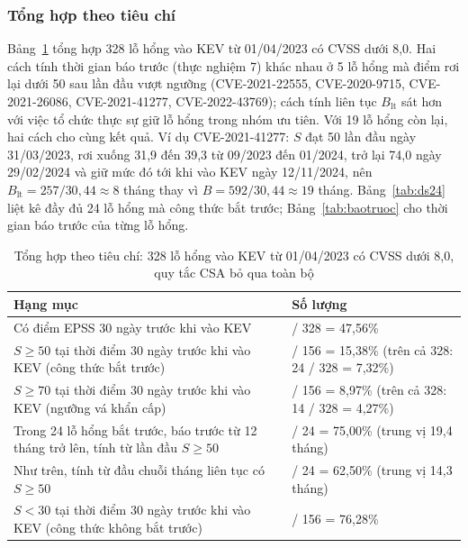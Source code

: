 \documentclass[conference]{IEEEtran}
\begin{document}
\subsubsection{Tổng hợp theo tiêu chí}
Bảng~\ref{tab:tonghopth} tổng hợp 328 lỗ hổng vào KEV từ 01/04/2023 có CVSS dưới 8,0. Hai cách tính thời gian báo trước (thực
nghiệm 7) khác nhau ở 5 lỗ hổng mà điểm rơi lại dưới 50 sau lần đầu vượt ngưỡng (CVE-2021-22555, CVE-2020-9715,
CVE-2021-26086, CVE-2021-41277, CVE-2022-43769); cách tính liên tục $B_{\text{lt}}$ sát hơn với việc tổ chức thực
sự giữ lỗ hổng trong nhóm ưu tiên. Với 19 lỗ hổng còn lại, hai cách cho cùng kết quả. Ví dụ CVE-2021-41277: $S$
đạt 50 lần đầu ngày 31/03/2023, rơi xuống 31,9 đến 39,3 từ 09/2023 đến 01/2024, trở lại 74,0 ngày 29/02/2024 và
giữ mức đó tới khi vào KEV ngày 12/11/2024, nên $B_{\text{lt}} = 257 / 30{,}44 \approx 8$ tháng thay vì
$B = 592 / 30{,}44 \approx 19$ tháng. Bảng~\ref{tab:ds24} liệt kê đầy đủ 24 lỗ hổng mà công thức bắt trước;
Bảng~\ref{tab:baotruoc} cho thời gian báo trước của từng lỗ hổng.

\begin{table}[t]
\centering
\caption{Tổng hợp theo tiêu chí: 328 lỗ hổng vào KEV từ 01/04/2023 có CVSS dưới 8,0, quy tắc CSA bỏ qua toàn bộ}\label{tab:tonghopth}
\footnotesize
\begin{tabular}{>{\raggedright\arraybackslash}p{4.6cm}>{\raggedright\arraybackslash}p{3.4cm}}
\toprule
Hạng mục & Số lượng \\
\midrule
Có điểm EPSS 30 ngày trước khi vào KEV & 156 / 328 = 47,56\% \\
$S \ge 50$ tại thời điểm 30 ngày trước khi vào KEV (công thức bắt trước) & 24 / 156 = 15,38\% (trên cả 328: 24 / 328 = 7,32\%) \\
$S \ge 70$ tại thời điểm 30 ngày trước khi vào KEV (ngưỡng vá khẩn cấp) & 14 / 156 = 8,97\% (trên cả 328: 14 / 328 = 4,27\%) \\
Trong 24 lỗ hổng bắt trước, báo trước từ 12 tháng trở lên, tính từ lần đầu $S \ge 50$ & 18 / 24 = 75,00\% (trung vị 19,4 tháng) \\
Như trên, tính từ đầu chuỗi tháng liên tục có $S \ge 50$ & 15 / 24 = 62,50\% (trung vị 14,3 tháng) \\
$S < 30$ tại thời điểm 30 ngày trước khi vào KEV (công thức không bắt trước) & 119 / 156 = 76,28\% \\
\bottomrule
\end{tabular}
\end{table}
\end{document}
